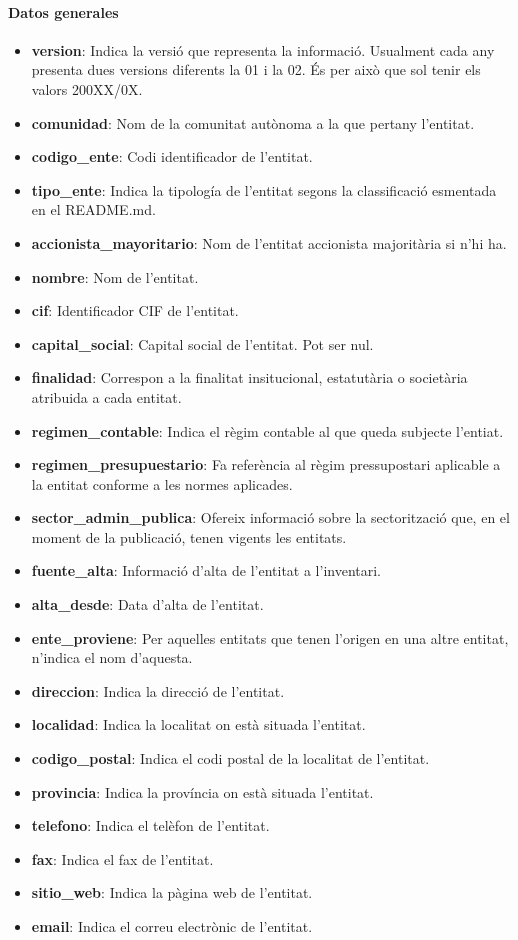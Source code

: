 \documentclass[12pt]{article}
\begin{document}
\paragraph{Datos generales\\}
\begin{itemize}
    \item \textbf{version}: Indica la versió que representa la informació. Usualment cada any presenta dues versions diferents la 01 i la 02. És per això que sol tenir els valors 200XX/0X.
    \item \textbf{comunidad}: Nom de la comunitat autònoma a la que pertany l'entitat.
    \item \textbf{codigo\_ente}: Codi identificador de l'entitat.
    \item \textbf{tipo\_ente}: Indica la tipología de l'entitat segons la classificació esmentada en el README.md.
    \item \textbf{accionista\_mayoritario}: Nom de l'entitat accionista majoritària si n'hi ha.
    \item \textbf{nombre}: Nom de l'entitat.
    \item \textbf{cif}: Identificador CIF de l'entitat.
    \item \textbf{capital\_social}: Capital social de l'entitat. Pot ser nul.
    \item \textbf{finalidad}: Correspon a la finalitat insitucional, estatutària o societària atribuida a cada entitat.
    \item \textbf{regimen\_contable}: Indica el règim contable al que queda subjecte l'entiat.
    \item \textbf{regimen\_presupuestario}: Fa referència al règim pressupostari aplicable a la entitat conforme a les normes aplicades.
    \item \textbf{sector\_admin\_publica}: Ofereix informació sobre la sectorització que, en el moment de la publicació, tenen vigents les entitats.
    \item \textbf{fuente\_alta}: Informació d'alta de l'entitat a l'inventari.
    \item \textbf{alta\_desde}: Data d'alta de l'entitat.
    \item \textbf{ente\_proviene}: Per aquelles entitats que tenen l'origen en una altre entitat, n'indica el nom d'aquesta.
    \item \textbf{direccion}: Indica la direcció de l'entitat.
    \item \textbf{localidad}: Indica la localitat on està situada l'entitat.
    \item \textbf{codigo\_postal}: Indica el codi postal de la localitat de l'entitat.
    \item \textbf{provincia}: Indica la província on està situada l'entitat.
    \item \textbf{telefono}: Indica el telèfon de l'entitat.
    \item \textbf{fax}: Indica el fax de l'entitat.
    \item \textbf{sitio\_web}: Indica la pàgina web de l'entitat.
    \item \textbf{email}:  Indica el correu electrònic de l'entitat.
\end{itemize}
\end{document}
